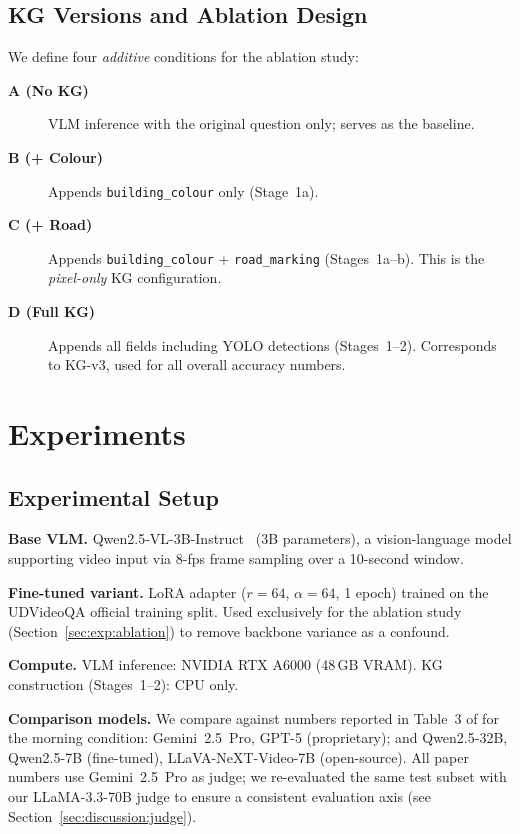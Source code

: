 \documentclass[10pt,conference,compsoc]{IEEEtran}
\begin{document}
\subsection{KG Versions and Ablation Design}
\label{sec:method:versions}

We define four \emph{additive} conditions for the ablation study:
\begin{description}
  \item[\textbf{A (No KG)}] VLM inference with the original question
        only; serves as the baseline.
  \item[\textbf{B (+ Colour)}] Appends \texttt{building\_colour}
        only (Stage~1a).
  \item[\textbf{C (+ Road)}] Appends \texttt{building\_colour}
        + \texttt{road\_marking} (Stages~1a--b).
        This is the \emph{pixel-only} KG configuration.
  \item[\textbf{D (Full KG)}] Appends all fields including YOLO
        detections (Stages~1--2). Corresponds to KG-v3, used for
        all overall accuracy numbers.
\end{description}


\section{Experiments}
\label{sec:experiments}

\subsection{Experimental Setup}

\textbf{Base VLM.}
Qwen2.5-VL-3B-Instruct~\cite{qwen2025} (3B parameters),
a vision-language model supporting video input via 8-fps
frame sampling over a 10-second window.

\textbf{Fine-tuned variant.}
LoRA adapter ($r = 64$, $\alpha = 64$, 1 epoch) trained on the
UDVideoQA official training split.
Used exclusively for the ablation study (Section~\ref{sec:exp:ablation})
to remove backbone variance as a confound.

\textbf{Compute.}
VLM inference: NVIDIA RTX A6000 (48\,GB VRAM).
KG construction (Stages~1--2): CPU only.

\textbf{Comparison models.}
We compare against numbers reported in Table~3 of
\cite{udvideoqa2026} for the morning condition:
Gemini~2.5~Pro, GPT-5 (proprietary); and
Qwen2.5-32B, Qwen2.5-7B (fine-tuned), LLaVA-NeXT-Video-7B
(open-source).
All paper numbers use Gemini~2.5~Pro as judge; we re-evaluated the
same test subset with our LLaMA-3.3-70B judge to ensure a
consistent evaluation axis (see Section~\ref{sec:discussion:judge}).
\end{document}
